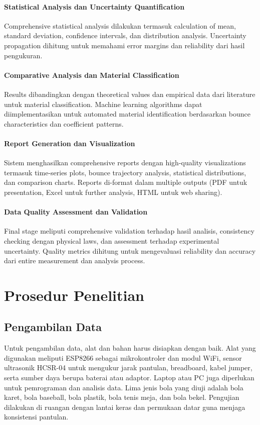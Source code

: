 \paragraph{Statistical Analysis dan Uncertainty Quantification} Comprehensive statistical analysis dilakukan termasuk calculation of mean, standard deviation, confidence intervals, dan distribution analysis. Uncertainty propagation dihitung untuk memahami error margins dan reliability dari hasil pengukuran.

\paragraph{Comparative Analysis dan Material Classification} Results dibandingkan dengan theoretical values dan empirical data dari literature untuk material classification. Machine learning algorithms dapat diimplementasikan untuk automated material identification berdasarkan bounce characteristics dan coefficient patterns.

\paragraph{Report Generation dan Visualization} Sistem menghasilkan comprehensive reports dengan high-quality visualizations termasuk time-series plots, bounce trajectory analysis, statistical distributions, dan comparison charts. Reports di-format dalam multiple outputs (PDF untuk presentation, Excel untuk further analysis, HTML untuk web sharing).

\paragraph{Data Quality Assessment dan Validation} Final stage meliputi comprehensive validation terhadap hasil analisis, consistency checking dengan physical laws, dan assessment terhadap experimental uncertainty. Quality metrics dihitung untuk mengevaluasi reliability dan accuracy dari entire measurement dan analysis process.

\section{Prosedur Penelitian}
\subsection{Pengambilan Data}
Untuk pengambilan data, alat dan bahan harus disiapkan dengan baik. Alat yang digunakan meliputi ESP8266 sebagai mikrokontroler dan modul WiFi, sensor ultrasonik HCSR-04 untuk mengukur jarak pantulan, breadboard, kabel jumper, serta sumber daya berupa baterai atau adaptor. Laptop atau PC juga diperlukan untuk pemrograman dan analisis data. Lima jenis bola yang diuji adalah bola karet, bola baseball, bola plastik, bola tenis meja, dan bola bekel. Pengujian dilakukan di ruangan dengan lantai keras dan permukaan datar guna menjaga konsistensi pantulan.

